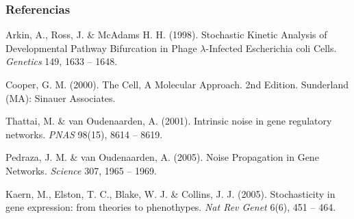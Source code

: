 \documentclass[10pt]{beamer}
\begin{document}
\begin{frame}
\frametitle{Referencias}
\footnotesize{
\begin{thebibliography}{99}

 Arkin, A., Ross, J. \& McAdams H. H. (1998).
\newblock Stochastic Kinetic Analysis of Developmental Pathway Bifurcation in Phage $\lambda$-Infected Escherichia coli Cells.
\newblock \emph{Genetics} 149, 1633 -- 1648.

 Cooper, G. M. (2000).
\newblock The Cell, A Molecular Approach. 2nd Edition.
\newblock Sunderland (MA): Sinauer Associates.

 Thattai, M. \& van Oudenaarden, A. (2001).
\newblock Intrinsic noise in gene regulatory networks.
\newblock \emph{PNAS} 98(15), 8614 -- 8619.

 Pedraza, J. M. \& van Oudenaarden, A. (2005).
\newblock Noise Propagation in Gene Networks.
\newblock \emph{Science} 307, 1965 -- 1969.

 Kaern, M., Elston, T. C., Blake, W. J. \& Collins, J. J. (2005).
\newblock Stochasticity in gene expression: from theories to phenothypes.
\newblock \emph{Nat Rev Genet} 6(6), 451 -- 464.

\end{thebibliography}
}
\end{frame}
\end{document}
